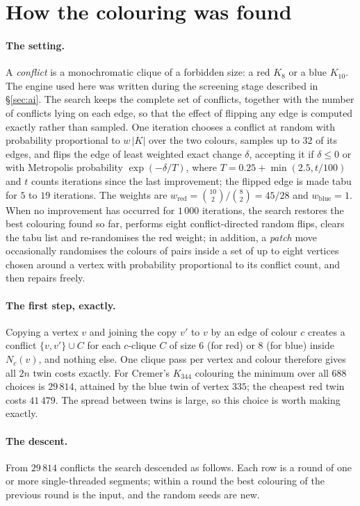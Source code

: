\documentclass[11pt]{article}
\begin{document}
\section{How the colouring was found}\label{sec:method}

\paragraph{The setting.}
A \emph{conflict} is a monochromatic clique of a forbidden size: a red $K_8$ or a blue $K_{10}$.
The engine used here was written during the screening stage described in \S\ref{sec:ai}.
The search keeps the complete set of conflicts, together with the number of conflicts lying on each
edge, so that the effect of flipping any edge is computed exactly rather than sampled. One iteration
chooses a conflict at random with probability proportional to $w\,|K|$ over the two colours, samples
up to $32$ of its edges, and flips the edge of least weighted exact change $\delta$, accepting it if
$\delta\le 0$ or with Metropolis probability $\exp(-\delta/T)$, where $T=0.25+\min(2.5,t/100)$ and
$t$ counts iterations since the last improvement; the flipped edge is made tabu for $5$ to $19$
iterations. The weights are $w_{\mathrm{red}}=\binom{10}{2}/\binom{8}{2}=45/28$ and
$w_{\mathrm{blue}}=1$. When no improvement has occurred for $1\,000$ iterations, the search restores
the best colouring found so far, performs eight conflict-directed random flips, clears the tabu list
and re-randomises the red weight; in addition, a \emph{patch} move occasionally randomises the colours
of pairs inside a set of up to eight vertices chosen around a vertex with probability proportional to
its conflict count, and then repairs freely.

\paragraph{The first step, exactly.}
Copying a vertex $v$ and joining the copy $v'$ to $v$ by an edge of colour $c$ creates a conflict
$\{v,v'\}\cup C$ for each $c$-clique $C$ of size $6$ (for red) or $8$ (for blue) inside $N_c(v)$, and
nothing else. One clique pass per vertex and colour therefore gives all $2n$ twin costs exactly. For
Cremer's $K_{344}$ colouring the minimum over all $688$ choices is $29\,814$, attained by the blue
twin of vertex $335$; the cheapest red twin costs $41\,479$. The spread between twins is large, so
this choice is worth making exactly.

\paragraph{The descent.}
From $29\,814$ conflicts the search descended as follows. Each row is a round of one or more
single-threaded segments; within a round the best colouring of the previous round is the input, and
the random seeds are new.
\end{document}
